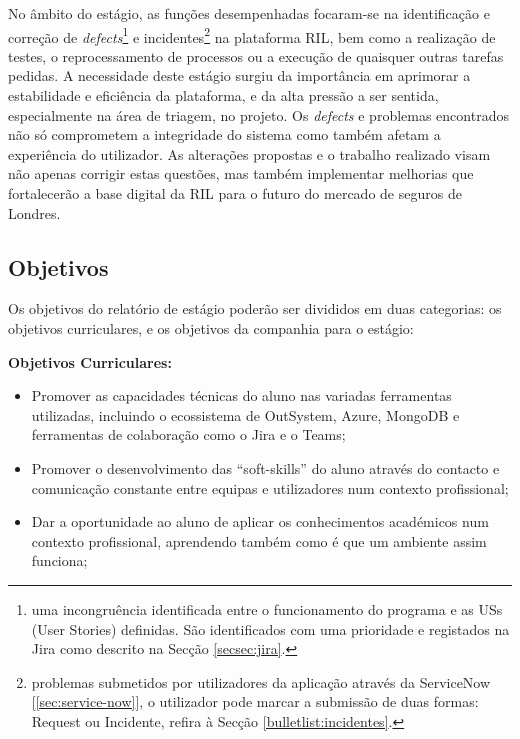        No âmbito do estágio, as funções desempenhadas focaram-se na identificação e correção de \textit{defects}\footnote{uma incongruência identificada entre o funcionamento do programa e as USs (User Stories) definidas. São identificados com uma prioridade e registados na Jira como descrito na Secção \ref{secsec:jira}.} e incidentes\footnote{problemas submetidos por utilizadores da aplicação através da ServiceNow [\ref{sec:service-now}], o utilizador pode marcar a submissão de duas formas: Request ou Incidente, refira à Secção \ref{bulletlist:incidentes}.} na plataforma RIL, bem como a realização de testes, o reprocessamento de processos ou a execução de quaisquer outras tarefas pedidas. A necessidade deste estágio surgiu da importância em aprimorar a estabilidade e eficiência da plataforma, e da alta pressão a ser sentida, especialmente na área de triagem, no projeto. Os \textit{defects} e problemas encontrados não só comprometem a integridade do sistema como também afetam a experiência do utilizador. As alterações propostas e o trabalho realizado visam não apenas corrigir estas questões, mas também implementar melhorias que fortalecerão a base digital da RIL para o futuro do mercado de seguros de Londres.

    
    \subsection{Objetivos}\label{subsec:objetivos}

        Os objetivos do relatório de estágio poderão ser divididos em duas categorias: os objetivos curriculares, e os objetivos da companhia para o estágio:
    
        \textbf{Objetivos Curriculares:}
        \begin{itemize}
          \item Promover as capacidades técnicas do aluno nas variadas ferramentas utilizadas, incluindo o ecossistema de OutSystem, Azure, MongoDB e ferramentas de colaboração como o Jira e o Teams;
          \item Promover o desenvolvimento das ``soft-skills'' do aluno através do contacto e comunicação constante entre equipas e utilizadores num contexto profissional;
          \item Dar a oportunidade ao aluno de aplicar os conhecimentos académicos num contexto profissional, aprendendo também como é que um ambiente assim funciona;
        \end{itemize}
    
